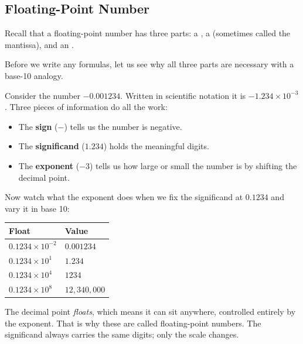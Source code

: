 \subsection{Floating-Point Number}

Recall that a floating-point number has three parts:
a , a
 (sometimes called the mantissa), and
an .

Before we write any formulas, let us see why all three parts are necessary
with a base-10 analogy.

Consider the number $-0.001234$.
Written in scientific notation it is $-1.234 \times 10^{-3}$.
Three pieces of information do all the work:
\begin{itemize}
  \item The \textbf{sign} ($-$) tells us the number is negative.
  \item The \textbf{significand} ($1.234$) holds the meaningful digits.
  \item The \textbf{exponent} ($-3$) tells us how large or small the number
        is by shifting the decimal point.
\end{itemize}

Now watch what the exponent does when we fix the significand at $0.1234$ and
vary it in base 10:

\begin{center}
\begin{tabular}{ll}
  \hline
  Float                    & Value \\
  \hline
  $0.1234 \times 10^{-2}$  & $0.001234$ \\
  $0.1234 \times 10^{1}$   & $1.234$ \\
  $0.1234 \times 10^{4}$   & $1234$ \\
  $0.1234 \times 10^{8}$   & $12{,}340{,}000$ \\
  \hline
\end{tabular}
\end{center}

The decimal point \emph{floats}, which means it can sit anywhere, controlled entirely
by the exponent.
That is why these are called floating-point numbers.
The significand always carries the same digits; only the scale changes.

